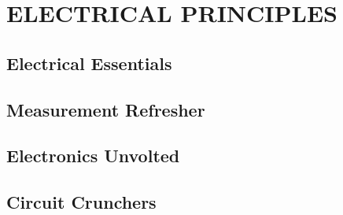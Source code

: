 \documentclass[12pt]{book}
\begin{document}
\chapter{ELECTRICAL PRINCIPLES}
\section{Electrical Essentials}












\section{Measurement Refresher}













\section{Electronics Unvolted}













\section{Circuit Crunchers}














\end{document}
